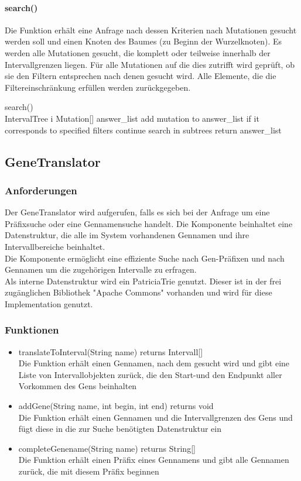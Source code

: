 \paragraph{search()}
Die Funktion erhält eine Anfrage nach dessen Kriterien nach Mutationen gesucht werden soll und einen Knoten des Baumes (zu Beginn der Wurzelknoten). Es werden alle Mutationen gesucht, die komplett oder teilweise innerhalb der Intervallgrenzen liegen. Für alle Mutationen auf die dies zutrifft wird geprüft, ob sie den Filtern entsprechen nach denen gesucht wird. Alle Elemente, die die Filtereinschränkung erfüllen werden zurückgegeben.
\begin{algorithm}
search()\\
IntervalTree i\;
Mutation[] answer\_list\;
{
{add mutation to answer\_list if it corresponds to specified filters\;}
{continue search in subtrees\;}}
return answer\_list\;
\end{algorithm}
\newpage

\subsection{GeneTranslator}
\subsubsection{Anforderungen}
Der GeneTranslator wird aufgerufen, falls es sich bei der Anfrage um eine Präfixsuche oder eine Gennamensuche handelt. Die Komponente beinhaltet eine Datenstruktur, die alle im System vorhandenen Gennamen und ihre Intervallbereiche beinhaltet.\\
Die Komponente ermöglicht eine effiziente Suche nach Gen-Präfixen und nach Gennamen um die zugehörigen Intervalle zu erfragen.\\
Als interne Datenstruktur wird ein PatriciaTrie genutzt. Dieser ist in der frei zugänglichen Bibliothek "Apache Commons" vorhanden und wird für diese Implementation genutzt.

\subsubsection{Funktionen}
\begin{itemize}
\item translateToInterval(String name) returns Intervall[]\\
Die Funktion erhält einen Gennamen, nach dem gesucht wird und gibt eine Liste von Intervallobjekten zurück, die den Start-und den Endpunkt aller Vorkommen des Gens beinhalten
\item addGene(String name, int begin, int end) returns void\\
Die Funktion erhält einen Gennamen und die Intervallgrenzen des Gens und fügt diese in die zur Suche benötigten Datenstruktur ein
\item completeGenename(String name) returns String[]\\
Die Funktion erhält einen Präfix eines Gennamens und gibt alle Gennamen zurück, die mit diesem Präfix beginnen
\end{itemize}

